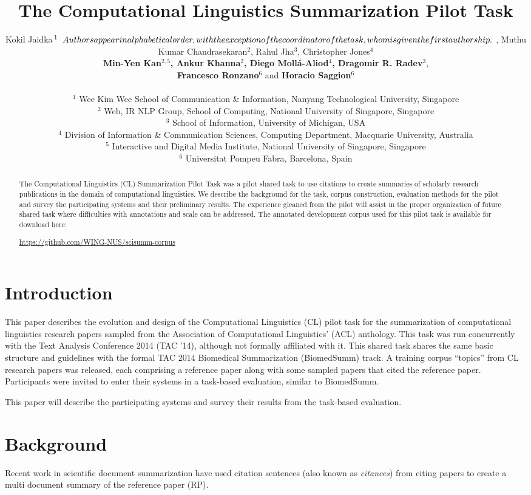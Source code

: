 \documentclass[11pt]{article}
\title{The Computational Linguistics Summarization Pilot Task}
\author{Kokil Jaidka$^{1}\relax{\hspace{.2cm}Authors appear in alphabetical order, with the exception of the coordinator of the task, whom is given the first authorship.} $ , Muthu Kumar Chandrasekaran$^{2}$, Rahul Jha$^{3}$, Christopher Jones$^{4}$ \\ {\bf Min-Yen Kan}$^{2,5}${\bf , Ankur Khanna}$^{2}${\bf , Diego Moll\'{a}-Aliod}$^{4}${\bf , Dragomir R. Radev}$^{3}$, \\ {\bf Francesco Ronzano}$^{6}$ and {\bf Horacio Saggion}$^{6}$ \\ 
\\
$^1$ Wee Kim Wee School of Communication \& Information, Nanyang Technological University, Singapore \\
$^2$ Web, IR \/ NLP Group, School of Computing, National University of Singapore, Singapore \\
$^3$ School of Information, University of Michigan, USA\\
$^4$ Division of Information \& Communication Sciences, Computing Department, Macquarie University, Australia \\
$^5$ Interactive and Digital Media Institute, National University of Singapore, Singapore \\
$^6$ Universitat Pompeu Fabra, Barcelona, Spain }
\date{}
\begin{document}
\maketitle
\begin{abstract}
The Computational Linguistics (CL) Summarization Pilot Task was a
pilot shared task to use citations to create summaries of scholarly
research publications in the domain of computational linguistics.  We
describe the background for the task, corpus construction, evaluation
methods for the pilot and survey the participating systems and their
preliminary results.  The experience gleaned from the pilot will
assist in the proper organization of future shared task where
difficulties with annotations and scale can be addressed. The annotated 
development corpus used for this pilot task is available for download 
here: \begin{sloppypar}
\url{https://github.com/WING-NUS/scisumm-corpus}
\end{sloppypar}
\end{abstract}

\section{Introduction}

This paper describes the evolution and design of the Computational
Linguistics (CL) pilot task for the summarization of computational 
linguistics research papers sampled from the Association of 
Computational Linguistics' (ACL) anthology. This task was run 
concurrently with the Text Analysis Conference 2014 (TAC '14), 
although not formally affiliated with it. This shared task shares 
the same basic structure and guidelines with the formal TAC 2014 
Biomedical Summarization (BiomedSumm) track. A training corpus 
``topics'' from CL research papers was released, each comprising 
a reference paper along with some sampled papers that cited the 
reference paper. Participants were invited to enter their systems
in a task-based evaluation, similar to BiomedSumm.

This paper will describe the participating systems and survey their 
results from the task-based evaluation.

\section{Background}
Recent work \cite{mohammad2009,abu2011} in scientific document
summarization have used citation sentences (also known as {\it
  citances}) from citing papers to create a multi document summary of
the reference paper (RP).
\end{document}
